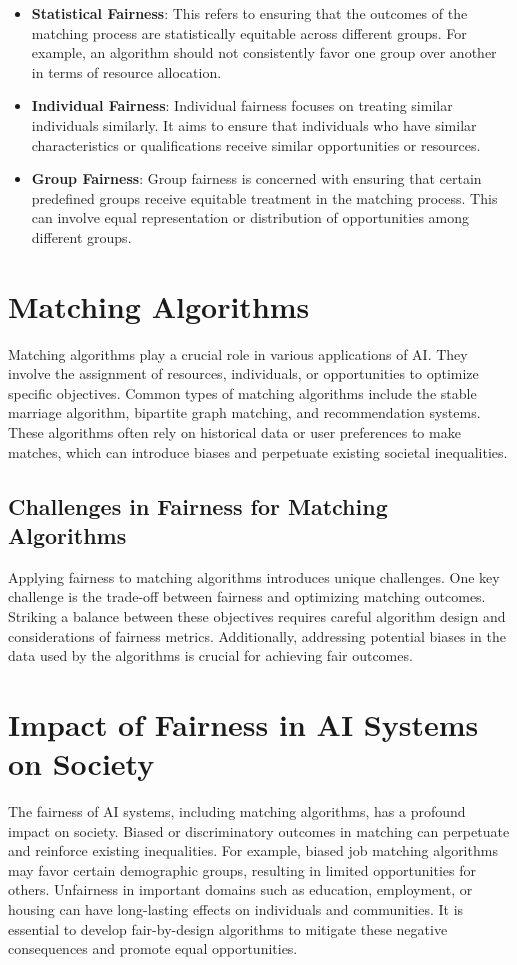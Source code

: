 \documentclass[12pt,a4paper,openright,twoside]{book}
\begin{document}
\begin{itemize}
    \item \textbf{Statistical Fairness}: This refers to ensuring that the outcomes of the matching process are statistically equitable across different groups. For example, an algorithm should not consistently favor one group over another in terms of resource allocation.
    \item \textbf{Individual Fairness}: Individual fairness focuses on treating similar individuals similarly. It aims to ensure that individuals who have similar characteristics or qualifications receive similar opportunities or resources.
    \item \textbf{Group Fairness}: Group fairness is concerned with ensuring that certain predefined groups receive equitable treatment in the matching process. This can involve equal representation or distribution of opportunities among different groups.
\end{itemize}

\section{Matching Algorithms}
Matching algorithms play a crucial role in various applications of AI. They involve the assignment of resources, individuals, or opportunities to optimize specific objectives. Common types of matching algorithms include the stable marriage algorithm, bipartite graph matching, and recommendation systems. These algorithms often rely on historical data or user preferences to make matches, which can introduce biases and perpetuate existing societal inequalities.

\subsection{Challenges in Fairness for Matching Algorithms}
Applying fairness to matching algorithms introduces unique challenges. One key challenge is the trade-off between fairness and optimizing matching outcomes. Striking a balance between these objectives requires careful algorithm design and considerations of fairness metrics. Additionally, addressing potential biases in the data used by the algorithms is crucial for achieving fair outcomes.

\section{Impact of Fairness in AI Systems on Society}
The fairness of AI systems, including matching algorithms, has a profound impact on society. Biased or discriminatory outcomes in matching can perpetuate and reinforce existing inequalities. For example, biased job matching algorithms may favor certain demographic groups, resulting in limited opportunities for others. Unfairness in important domains such as education, employment, or housing can have long-lasting effects on individuals and communities. It is essential to develop fair-by-design algorithms to mitigate these negative consequences and promote equal opportunities.
\end{document}

